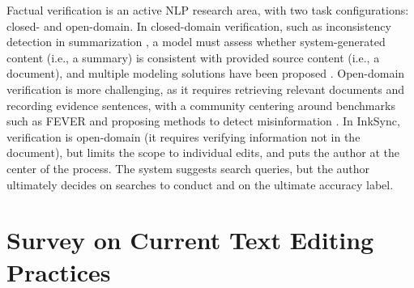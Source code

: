 \documentclass[manuscript]{acmart}
\begin{document}
Factual verification is an active NLP research area, with two task configurations: closed- and open-domain. In closed-domain verification, such as inconsistency detection in summarization \cite{maynez2020faithfulness,kryscinski2019neural,honovich2022true,laban2023llms}, a model must assess whether system-generated content (i.e., a summary) is consistent with provided source content (i.e., a document), and multiple modeling solutions have been proposed \cite{laban2022summac,fabbri2022qafacteval,goyal2021annotating}. Open-domain verification is more challenging, as it requires retrieving relevant documents and recording evidence sentences, with a community centering around benchmarks such as FEVER \cite{thorne2018fever} and proposing methods to detect misinformation \cite{sharma2019combating,nasir2021fake,guo2022survey}. In InkSync, verification is open-domain (it requires verifying information not in the document), but limits the scope to individual edits, and puts the author at the center of the process. The system suggests search queries, but the author ultimately decides on searches to conduct and on the ultimate accuracy label.

\section{Survey on Current Text Editing Practices} \label{sec:survey}
\end{document}
